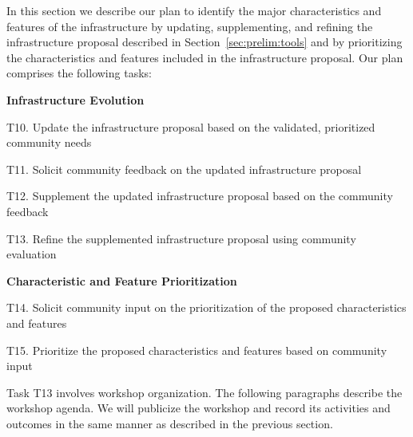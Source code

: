 


\vspace*{-4.5pt}
In this section we describe our plan
to identify the major characteristics and features of the infrastructure
by updating, supplementing, and refining the infrastructure proposal described in Section~\ref{sec:prelim:tools}
and by prioritizing the characteristics and features included in the infrastructure proposal.
Our plan comprises the following tasks:
\begin{itemize*}
\setlength\itemindent{-1.15em}
\vspace*{-4.5pt}
\item[] \textbf{Infrastructure Evolution}
   \begin{enumerate*}
   \setlength\itemindent{-1em}
   \vspace*{-3pt}
   \item[T10.] Update the infrastructure proposal based on the validated, prioritized community needs
   \item[T11.] Solicit community feedback on the updated infrastructure proposal
   \item[T12.] Supplement the updated infrastructure proposal based on the community feedback
   \item[T13.] Refine the supplemented infrastructure proposal using community evaluation
   \end{enumerate*}
\vspace*{-3pt}
\item[] \textbf{Characteristic and Feature Prioritization}
   \begin{enumerate*}
   \setlength\itemindent{-1em}
   \vspace*{-3pt}
   \item[T14.] Solicit community input on the prioritization of the proposed characteristics and features
   \item[T15.] Prioritize the proposed characteristics and features based on community input
   \end{enumerate*}
   \vspace*{-9pt}
\end{itemize*}

\vspace*{-6pt}
Task T13 involves workshop organization.
The following paragraphs describe the workshop agenda.
We will publicize the workshop and record its activities and outcomes
in the same manner as described in the previous section.

